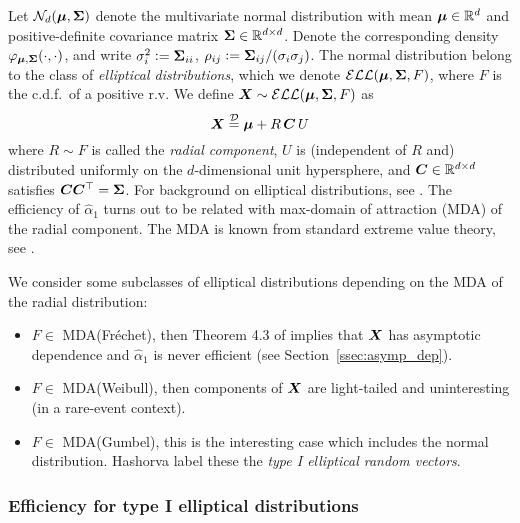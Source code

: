 Let $\mathcal{N}_d(\bm{\mu},\bm{\Sigma})$ denote the multivariate normal distribution with mean $\bm{\mu} \in \mathbb{R}^d$ and positive-definite covariance matrix $\bm{\Sigma} \in \mathbb{R}^{d \times d}$. Denote the corresponding density $\varphi_{\bm{\mu}, \bm{\Sigma}}(\cdot,\cdot)$, and write $\sigma_i^2 := \bm{\Sigma}_{ii}$, $\rho_{ij} := \bm{\Sigma}_{ij}/(\sigma_i \sigma_j)$. 
The normal distribution belong to the class of \emph{elliptical distributions},
which we denote $\mathcal{ELL}(\bm{\mu}, \bm{\Sigma}, F)$, where $F$ is the c.d.f.\ of a positive r.v. We define $\bm{X} \sim \mathcal{ELL}(\bm{\mu}, \bm{\Sigma}, F)$ as
\begin{equation}\label{ellip_distr}
	\bm{X} \stackrel{{\scriptstyle \mathcal{D}}}{=} \bm{\mu} + R \, \bm{C} \, U
\end{equation}
where $R \sim F$ is called the \emph{radial component}, $U$ is (independent of $R$ and) distributed uniformly on the $d$-dimensional unit hypersphere, and $\bm{C} \in \mathbb{R}^{d \times d}$ satisfies $\bm{C} \bm{C}^\top = \bm{\Sigma}$. 
For background on elliptical distributions, see \cite{MR1990662}.
The efficiency of $\hat{\alpha}_1$ turns out to be related with
max-domain of attraction (MDA) of the radial 
component. The MDA is known from standard extreme value theory, see \cite{de2007extreme}.

We consider some subclasses of elliptical distributions depending on the MDA 
of the radial distribution:
\begin{itemize}
\item $F \in$ MDA(Fr\'echet), then Theorem 4.3 of \cite{hult2002multivariate} implies that $\bm{X}$ has asymptotic dependence and $\hat{\alpha}_1$ is never efficient (see Section~\ref{ssec:asymp_dep}).
\item $F \in$ MDA(Weibull), then components of $\bm{X}$ are light-tailed and uninteresting (in a rare-event context).
\item $F \in$ MDA(Gumbel), this is the interesting case which includes the normal distribution. Hashorva \cite{hashorva2007asymptotic} label these the \emph{type I elliptical random vectors}.
\end{itemize}

\subsubsection{Efficiency for type I elliptical distributions} \label{scn:type_1}

